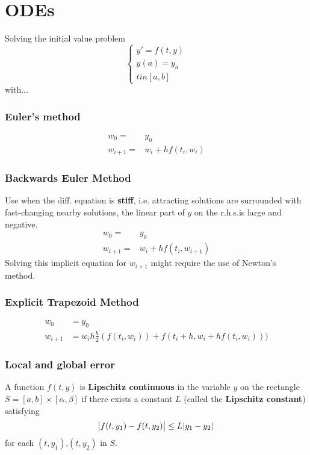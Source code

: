\section{ODEs}
Solving the initial value problem
$$
\begin{cases}
y' = f(t,y) \\
y(a) = y_a \\
t in [a,b]
\end{cases}
$$
with...
\subsubsection{Euler's method}
\begin{align*}
w_0 = & y_0 \\
w_{i+1} = & w_{i} + h f(t_i, w_i)
\end{align*}

\subsubsection{Backwards Euler Method}
Use when the diff. equation is \textbf{stiff}, i.e. attracting solutions are surrounded with fast-changing nearby solutions, the linear part of $y$ on the r.h.s.is large and negative.
\begin{align*}
w_0 = &y_0 \\
w_{i+1} = & w_{i} + h f(t_i, w_{i+1})
\end{align*}
Solving this implicit equation for $w_{i+1}$ might require the use of Newton's method.
 
\subsubsection{Explicit Trapezoid Method}
\begin{align*}
w_0 &= y_0 \\
w_{i+1} &= w_i h \frac{h}{2}(f(t_i,w_i)) + f(t_i + h, w_i + hf(t_i,w_i)))
\end{align*}

\subsubsection{Local and global error}
\begin{definition}
A function $f(t,y)$ is \textbf{Lipschitz continuous} in the variable $y$ on the rectangle $S = [a,b] \times [\alpha, \beta]$ if there exists a constant $L$ (called the \textbf{Lipschitz constant}) satisfying
$$
\abs{f(t,y_1) - f(t,y_2)} \leq L\abs{y_1 - y_2}
$$
for each $(t,y_1)$,$(t,y_2)$ in $S$.
\end{definition}

